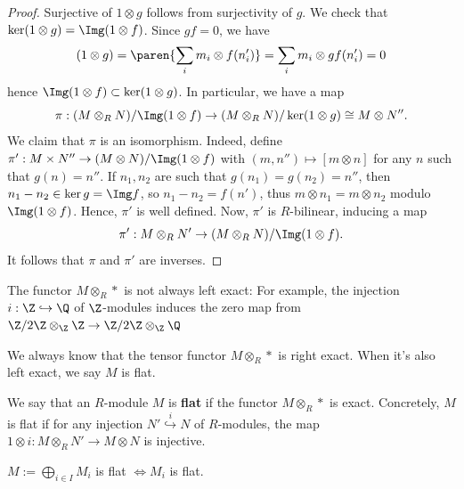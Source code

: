 \begin{proof}
Surjective of $1 \otimes g$ follows from surjectivity of $g$. We check that $\ker (1 \otimes g)  = \Img(1 \otimes f)$. Since $gf = 0$, we have
\begin{align*}
    (1 \otimes g) = \paren{\sum_i m_i \otimes f(n'_i)}= \sum_i m_i \otimes gf(n_i')=0
\end{align*}
hence $\Img ( 1 \otimes f) \subset \ker (1 \otimes g)$. In particular, we have a map
$$\pi :(M\otimes _RN)/\Img(1 \otimes f) \to (M\otimes _RN)/\ker (1 \otimes g) \cong M \otimes N''.$$
We claim that $\pi$ is an isomorphism. Indeed, define $\pi': M \times N'' \to (M \otimes N)/ \Img (1 \otimes f)$ with $(m,n'') \mapsto [m \otimes n]$ for any $n$ such that $g(n) = n''$. If $n_1,n_2$ are such that $g(n_1) = g(n_2)=n''$, then $n_1-n_2 \in \ker g=\Img f$,  so $n_1-n_2 = f(n')$, thus $m \otimes n_1 = m\otimes n_2$ modulo $\Img (1 \otimes f)$. Hence, $\pi'$ is well defined. Now, $\pi'$ is $R$-bilinear, inducing a map
$$\pi': M \otimes _R N' \to (M \otimes _RN) / \Img (1 \otimes f).$$
It follows that $\pi$ and $\pi'$ are inverses.
\end{proof}

\begin{ex}
    The functor $M\otimes _R *$ is not always left exact: For example, the injection $i:\Z \hookrightarrow \Q$ of $\Z$-modules induces the zero map from $\Z/2\Z \otimes _\Z \Z \to \Z/2\Z \otimes_\Z \Q$
\end{ex}

We always know that the tensor functor $M \otimes_R *$ is right exact. When it's also left exact, we say $M$ is flat.

\begin{defn}
    We say that an $R$-module $M$ is \textbf{flat} if the functor $M \otimes _R *$ is exact. Concretely, $M$ is flat if for any injection $N' \overset{i}{\hookrightarrow} N$ of $R$-modules, the map $1 \otimes i : M\otimes_R N' \to M \otimes N$ is injective.
\end{defn}

\begin{lem}
    $M:= \bigoplus_{i \in I}M_i$ is flat $\iff M_i$ is flat.
\end{lem}

